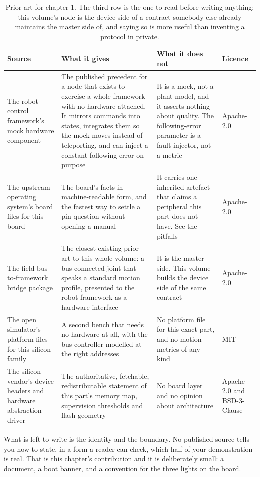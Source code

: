 \begin{table}[H]\centering\small
\begin{tabular}{p{34mm}p{46mm}p{38mm}p{20mm}}
\toprule
Source & What it gives & What it does not & Licence \\
\midrule
The robot control framework's mock hardware component & The published precedent for a node that exists to exercise a whole framework with no hardware attached. It mirrors commands into states, integrates them so the mock moves instead of teleporting, and can inject a constant following error on purpose & It is a mock, not a plant model, and it asserts nothing about quality. The following-error parameter is a fault injector, not a metric & Apache-2.0 \\
The upstream operating system's board files for this board & The board's facts in machine-readable form, and the fastest way to settle a pin question without opening a manual & It carries one inherited artefact that claims a peripheral this part does not have. See the pitfalls & Apache-2.0 \\
The field-bus-to-framework bridge package & The closest existing prior art to this whole volume: a bus-connected joint that speaks a standard motion profile, presented to the robot framework as a hardware interface & It is the master side. This volume builds the device side of the same contract & Apache-2.0 \\
The open simulator's platform files for this silicon family & A second bench that needs no hardware at all, with the bus controller modelled at the right addresses & No platform file for this exact part, and no motion metrics of any kind & MIT \\
The silicon vendor's device headers and hardware abstraction driver & The authoritative, fetchable, redistributable statement of this part's memory map, supervision thresholds and flash geometry & No board layer and no opinion about architecture & Apache-2.0 and BSD-3-Clause \\
\bottomrule
\end{tabular}
\caption{Prior art for chapter 1. The third row is the one to read before writing anything: this volume's node is the device side of a contract somebody else already maintains the master side of, and saying so is more useful than inventing a protocol in private.}
\end{table}

What is left to write is the identity and the boundary. No published source
tells you how to state, in a form a reader can check, which half of your
demonstration is real. That is this chapter's contribution and it is
deliberately small: a document, a boot banner, and a convention for the three
lights on the board.

